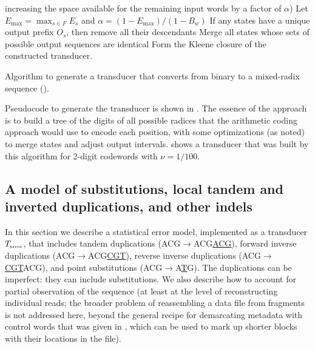 \documentclass[english]{article}
\begin{document}
\begin{algorithm}
{{                  increasing the space available for the remaining input words by a factor of $\alpha$)}
          \;
          Let $E_{\max} = \max_{s \in F} E_s$ and $\alpha = (1 - E_{\max}) / (1 - B_w)$
          \;
        }
    If any states have a unique output prefix $O_s$, then remove all their descendants
        \;
        Merge all states whose sets of possible output sequences are identical
        \;
        Form the Kleene closure of the constructed transducer.
\caption{
  Algorithm to generate a transducer that converts from binary to a mixed-radix sequence
  ().
}
\end{algorithm}

Pseudocode to generate the transducer is shown in .
The essence of the approach is to build a tree of the digits of all possible radices that the arithmetic coding approach
would use to encode each position, with some optimizations (as noted) to merge states and adjust output intervals.
 shows a transducer that was built by this algorithm
for 2-digit codewords with $\nu=1/100$.

\subsection{A model of substitutions, local tandem and inverted duplications, and other indels}

In this section we describe a statistical error model,
implemented as a transducer $T_{\mbox{\tiny error}}$,
that includes
tandem duplications (ACG$\to$ACG\underline{ACG}),
forward inverse duplications (ACG$\to$ACG\underline{CGT}),
reverse inverse duplications (ACG$\to$\underline{CGT}ACG),
and point substitutions (ACG$\to$A\underline{T}G).
The duplications can be imperfect: they can include substitutions.
We also describe how to account for partial observation of the sequence
(at least at the level of reconstructing individual reads;
the broader problem of reassembling a data file from fragments is not addressed here,
beyond the general recipe for demarcating metadata with control words
that was given in , which can be used to mark up shorter blocks
with their locations in the file).
\end{document}
